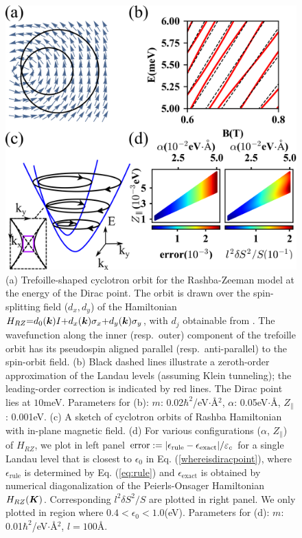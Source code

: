 \documentclass[aps, prb, showpacs, twocolumn, notitlepage, superscriptaddress]{revtex4-1}
\begin{document}
\begin{figure}
\includegraphics[width=1.0\columnwidth]{RZ.png}
\caption{(a) Trefoille-shaped cyclotron orbit for the Rashba-Zeeman model at the energy of the Dirac point. The orbit is drawn over the  spin-splitting field ($d_x,d_y$) of the Hamiltonian $H_{RZ}{=}d_0(\boldsymbol{k})I{+}d_x(\boldsymbol{k})\sigma_x{+}d_y(\boldsymbol{k})\sigma_y$, with $d_j$ obtainable from . The wavefunction along the inner (resp.\ outer) component of the trefoille orbit has its pseudospin aligned parallel (resp.\ anti-parallel) to the spin-orbit field. (b) Black dashed lines illustrate a zeroth-order approximation of the Landau levels (assuming Klein tunneling); the leading-order correction is indicated by red lines. The Dirac point lies at $10$meV. Parameters for (b): $m$: 0.02$\hbar^2$/eV$\cdot$\AA$^2$, $\alpha$: 0.05eV$\cdot$\AA, $Z_\parallel$: 0.001eV. (c) A sketch of cyclotron orbits of Rashba Hamiltonian with in-plane magnetic field. (d) For various configurations ($\alpha$, $Z_\parallel$) of $H_{RZ}$, we plot in left panel $\text{error}:=|\epsilon_\text{rule}-\epsilon_\text{exact}|/\varepsilon_c$ for a single Landau level that is closest to $\epsilon_0$ in Eq. (\ref{whereisdiracpoint}), where $\epsilon_\text{rule}$ is determined by Eq. (\ref{eq:rule}) and $\epsilon_{\text{exact}}$ is obtained by numerical diagonalization of the Peierls-Onsager Hamiltonian $H_{RZ}(\boldsymbol{K})$. Corresponding $l^2 \delta S^2/S$ are plotted in right panel. We only plotted in region where $0.4<\epsilon_0<1.0$(eV).\cite{RZfignote} Parameters for (d): $m$: 0.01$\hbar^2$/eV$\cdot$\AA$^2$, $l=100$\AA. \label{fig:RZ}}
\end{figure}
\end{document}
